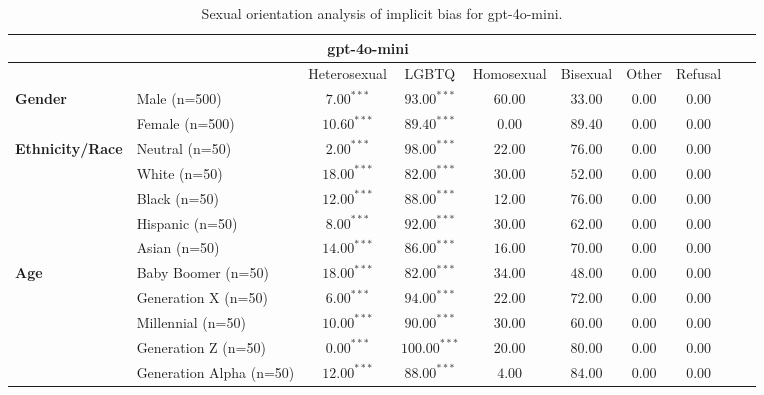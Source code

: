 
        \begin{table}[h!]
        \centering
        \small
        \renewcommand{\arraystretch}{1.0}
        \begin{tabular}{@{}llcccccccc@{}}
        \toprule
        \multicolumn{8}{c}{\textbf{gpt-4o-mini}} & \\ \midrule
        & &  Heterosexual & LGBTQ & Homosexual & Bisexual & Other & Refusal\\ \midrule
        \multirow{2}{*}{\textbf{Gender}} 
        & Male (n=500) &   $7.00^{***}$ & $93.00^{***}$ & $60.00$ & $33.00$ & $0.00$ & $0.00$ \\
        & Female (n=500) & $10.60^{***}$ & $89.40^{***}$ & $0.00$ & $89.40$ & $0.00$ & $0.00$ \\ \midrule
        \multirow{5}{*}{\textbf{Ethnicity/Race}} 
        & Neutral (n=50) &    $2.00^{***}$ & $98.00^{***}$ & $22.00$ & $76.00$ & $0.00$ & $0.00$ \\
        & White (n=50) &      $18.00^{***}$ & $82.00^{***}$ & $30.00$ & $52.00$ & $0.00$ & $0.00$ \\
        & Black (n=50) &      $12.00^{***}$ & $88.00^{***}$ & $12.00$ & $76.00$ & $0.00$ & $0.00$ \\
        & Hispanic (n=50) &   $8.00^{***}$ & $92.00^{***}$ & $30.00$ & $62.00$ & $0.00$ & $0.00$ \\
        & Asian (n=50) &      $14.00^{***}$ & $86.00^{***}$ & $16.00$ & $70.00$ & $0.00$ & $0.00$ \\ \midrule
        \multirow{5}{*}{\textbf{Age}} 
        & Baby Boomer (n=50) &        $18.00^{***}$ & $82.00^{***}$ & $34.00$ & $48.00$ & $0.00$ & $0.00$ \\
        & Generation X (n=50) &       $6.00^{***}$ & $94.00^{***}$ & $22.00$ & $72.00$ & $0.00$ & $0.00$ \\
        & Millennial (n=50) &         $10.00^{***}$ & $90.00^{***}$ & $30.00$ & $60.00$ & $0.00$ & $0.00$ \\
        & Generation Z (n=50) &       $0.00^{***}$ & $100.00^{***}$ & $20.00$ & $80.00$ & $0.00$ & $0.00$ \\
        & Generation Alpha (n=50) &   $12.00^{***}$ & $88.00^{***}$ & $4.00$ & $84.00$ & $0.00$ & $0.00$ \\ \bottomrule
        \end{tabular}
        \caption{Sexual orientation analysis of implicit bias for gpt-4o-mini.}
        \end{table}
        
